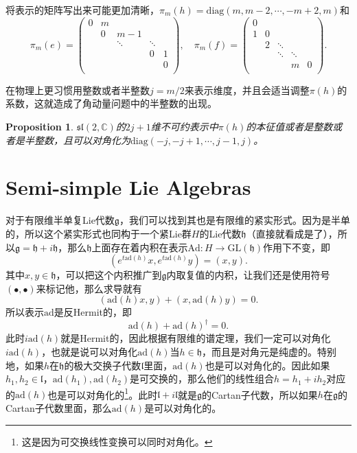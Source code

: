 \documentclass[9pt]{extbook}
\theoremstyle{plain}
\newtheorem{pro}[defi]{Proposition}
\newcommand{\lag}{{\mathfrak{g}}}  %
\newcommand{\ad}{{\mathrm{ad}}}
\begin{document}
将表示的矩阵写出来可能更加清晰，$\pi_m(h)=\mathrm{diag}(m,m-2,\cdots,-m+2,m)$和
\[
\pi_m(e)=\begin{pmatrix}
	0&m&&&\\
	&0&m-1&&\\
	&&\ddots&\ddots&\\
	&&&0&1\\
	&&&&0\\
\end{pmatrix},\quad
\pi_m(f)=\begin{pmatrix}
	0&&&&\\
	1&0&&&\\
	&2&\ddots&&\\
	&&\ddots&\ddots&\\
	&&&m&0\\
\end{pmatrix}.
\]

在物理上更习惯用整数或者半整数$j=m/2$来表示维度，并且会适当调整$\pi(h)$的系数，这就造成了角动量问题中的半整数的出现。
\begin{pro}
$\mathfrak{sl}(2,\mathbb{C})$的$2j+1$维不可约表示中$\pi(h)$的本征值或者是整数或者是半整数，且可以对角化为$\mathrm{diag}(-j,-j+1,\cdots,j-1,j)$。
\end{pro}

\section{Semi-simple Lie Algebras}
对于有限维半单复Lie代数$\lag$，我们可以找到其也是有限维的紧实形式。因为是半单的，所以这个紧实形式也同构于一个紧Lie群$H$的Lie代数$\mathfrak{h}$（直接就看成是了），所以$\lag=\mathfrak{h}+i\mathfrak{h}$，那么$\mathfrak{h}$上面存在着内积在表示$\mathrm{Ad}:H\to \mathrm{GL}(\mathfrak{h})$作用下不变，即
\[
	(e^{t\ad(h)}x,e^{t\ad(h)}y)=(x,y).
\]
其中$x,y\in\mathfrak{h}$，可以把这个内积推广到$\lag$内取复值的内积，让我们还是使用符号$(\bullet,\bullet)$来标记他，那么求导就有
\[
	(\ad(h)x,y)+(x,\ad(h)y)=0.
\]
所以表示$\ad$是反Hermit的，即
\[
	\ad(h)+\ad(h)^\dag=0.
\]
此时$i\ad(h)$就是Hermit的，因此根据有限维的谱定理，我们一定可以对角化$i\ad(h)$，也就是说可以对角化$\ad(h)$当$h\in \mathfrak{h}$，而且是对角元是纯虚的。特别地，如果$h$在$\mathfrak{h}$的极大交换子代数$\mathfrak{l}$里面，$\ad(h)$也是可以对角化的。因此如果$h_1,h_2\in\mathfrak{l}$，$\ad(h_1),\ad(h_2)$是可交换的，那么他们的线性组合$h=h_1+ih_2$对应的$\ad(h)$也是可以对角化的\footnote{这是因为可交换线性变换可以同时对角化。}。此时$\mathfrak{l}+i\mathfrak{l}$就是$\lag$的Cartan子代数，所以如果$h$在$\lag$的Cartan子代数里面，那么$\ad(h)$是可以对角化的。
\end{document}
